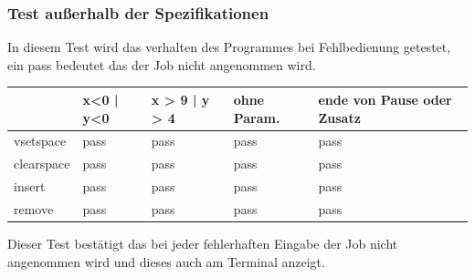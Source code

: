 \subsubsection {Test außerhalb der Spezifikationen}

In diesem Test wird das verhalten des Programmes bei Fehlbedienung getestet, ein pass bedeutet das der Job nicht angenommen wird.

\begin{tabular}{|l|l|l|l|l|}
\hline
         	&  x<0 | y<0 & x > 9 | y > 4 & ohne Param.& ende von Pause oder Zusatz\\
\hline
vsetspace & pass & pass & pass & pass \\
\hline
clearspace & pass & pass & pass & pass \\
\hline
insert & pass & pass & pass & pass \\
\hline
remove & pass & pass & pass & pass \\
\hline
\end{tabular}

Dieser Test bestätigt das bei jeder fehlerhaften Eingabe der Job nicht angenommen wird und dieses auch am Terminal anzeigt.




